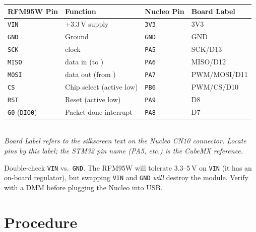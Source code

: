 \documentclass[11pt,letterpaper]{article}
\begin{document}
\begin{table}[h!]
	\centering
	\begin{tabular}{l l l l}
		\toprule
		\textbf{RFM95W Pin} & \textbf{Function} & \textbf{Nucleo Pin} & \textbf{Board Label} \\
		\midrule
		\texttt{VIN} & +3.3\,V supply & \texttt{3V3} & 3V3 \\
		\texttt{GND} & Ground & \texttt{GND} & GND \\
		\texttt{SCK} & \SPI{} clock & \texttt{PA5} & SCK/D13 \\
		\texttt{MISO} & \SPI{} data in (to \MCU{}) & \texttt{PA6} & MISO/D12 \\
		\texttt{MOSI} & \SPI{} data out (from \MCU{}) & \texttt{PA7} & PWM/MOSI/D11 \\
		\texttt{CS} & Chip select (active low) & \texttt{PB6} & PWM/CS/D10 \\
		\texttt{RST} & Reset (active low) & \texttt{PA9} & D8 \\
		\texttt{G0} (\texttt{DIO0}) & Packet-done interrupt & \texttt{PA8} & D7 \\
		\bottomrule
	\end{tabular}
	\\[4pt]
	\footnotesize\textit{Board Label refers to the silkscreen text on the Nucleo CN10 connector. Locate pins by this label; the STM32 pin name (PA5, etc.) is the CubeMX reference.}
\end{table}



\begin{tcolorbox}[warning={Wire Before You Power}]
	Double-check \texttt{VIN} vs.\ \texttt{GND}. The RFM95W will tolerate 3.3--5\,V on \texttt{VIN} (it has an on-board regulator), but swapping \texttt{VIN} and \texttt{GND} \textit{will} destroy the module. Verify with a \mbox{DMM} before plugging the Nucleo into USB.
\end{tcolorbox}

\newpage
\section{Procedure}
\end{document}
